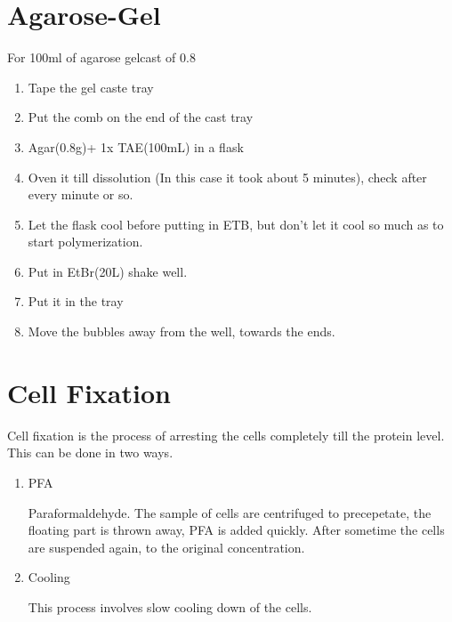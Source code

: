 \documentclass[11pt,twoside,a4paper]{article}
\begin{document}
\section{Agarose-Gel}
For 100ml of agarose gelcast of 0.8%
\begin{enumerate}
	\item Tape the gel caste tray
	\item Put the comb on the end of the cast tray
	\item Agar(0.8g)+ 1x TAE(100mL) in a flask
	\item Oven it till dissolution (In this case it took about 5 minutes), check after every minute or so.
	\item Let the flask cool before putting in ETB, but don't let it cool so much as to start polymerization.
	\item Put in EtBr(20\textmu{}L) shake well.
	\item Put it in the tray
	\item Move the bubbles away from the well, towards the ends.
\end{enumerate}

\section{Cell Fixation}
Cell fixation is the process of arresting the cells completely till the protein level. This can be done in two ways.
\begin{enumerate}
	\item PFA

		Paraformaldehyde. The sample of cells are centrifuged to precepetate, the floating part is thrown away, PFA is added quickly. After sometime the cells are suspended again, to the original concentration.
	\item Cooling

		This process involves slow cooling down of the cells.
\end{enumerate}
\end{document}
